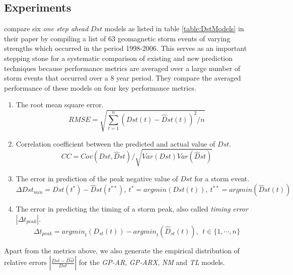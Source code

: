 \documentclass[referee,a4paper,12pt,traditabstract]{swsc}
\begin{document}
\begin{linenumbers}
\section{Experiments} \label{sec:exp}

\citet{Ji2012} compare six \emph{one step ahead} $Dst$ models as listed in table \ref{table:DstModels} in their paper by compiling a list of 63 geomagnetic storm events of varying strengths which occurred in the period 1998-2006. This serves as an important stepping stone for a systematic comparison of existing and new prediction techniques because performance metrics are averaged over a large number of storm events that occurred over a 8 year period. They compare the averaged performance of these models on four key performance metrics.

\begin{enumerate}
    \item The root mean square error.
    \begin{equation}
        RMSE = \sqrt{\sum_{t=1}^{n} (Dst(t) - \hat{D}st(t))^2 / n}
    \end{equation}
    \item Correlation coefficient between the predicted and actual value of $Dst$.
    \begin{equation}
        CC = Cov(Dst, \hat{D}st)/\sqrt{Var(Dst) Var(\hat{D}st)}
    \end{equation}
    \item The error in prediction of the peak negative value of $Dst$ for a storm event.
    \begin{equation}
        \Delta Dst_{min} = Dst(t^*) - \hat{D}st(t^{**}), \ t^* = argmin(Dst(t)),\ t^{**} = argmin(\hat{D}st(t))
    \end{equation}
    \item The error in predicting the timing of a storm peak, also called \emph{timing error} $|\Delta t_{peak}|$.
    \begin{equation}
        \Delta t_{peak} = \mathit{argmin}_{t}(D_{st}(t)) - \mathit{argmin}_t(\hat{D}_{st}(t)), \ \ t \in \{1, \cdots, n\}
    \end{equation}
\end{enumerate}

Apart from the metrics above, we also generate the empirical distribution of relative errors $|\frac{Dst - \hat{Dst}}{Dst}|$ for the \emph{GP-AR}, \emph{GP-ARX}, \emph{NM} and \emph{TL} models.



\end{linenumbers}
\end{document}
